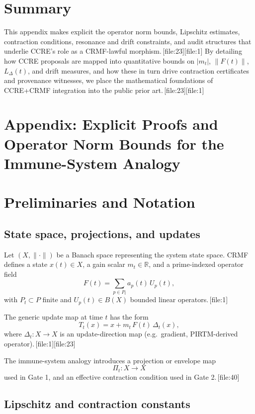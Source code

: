 \documentclass[11pt]{article}
\begin{document}
\section{Summary}

This appendix makes explicit the operator norm bounds, Lipschitz estimates, contraction conditions, resonance and drift constraints, and audit structures that underlie CCRE's role as a CRMF-lawful morphism.\,[file:23][file:1]
By detailing how CCRE proposals are mapped into quantitative bounds on $|m_t|$, $\|F(t)\|$, $L_\Delta(t)$, and drift measures, and how these in turn drive contraction certificates and provenance witnesses, we place the mathematical foundations of CCRE+CRMF integration into the public prior art.\,[file:23][file:1]

\appendix
\section*{Appendix: Explicit Proofs and Operator Norm Bounds for the Immune-System Analogy}

\section{Preliminaries and Notation}

\subsection{State space, projections, and updates}

Let \((X,\|\cdot\|)\) be a Banach space representing the system state space.
CRMF defines a state \(x(t)\in X\), a gain scalar \(m_t\in\mathbb{R}\), and a prime-indexed operator field
\[
F(t) = \sum_{p\in P_t} a_p(t)\,U_p(t),
\]
with \(P_t\subset P\) finite and \(U_p(t)\in B(X)\) bounded linear operators.\,[file:1]

The generic update map at time \(t\) has the form
\[
T_t(x) = x + m_t\,F(t)\,\Delta_t(x),
\]
where \(\Delta_t:X\to X\) is an update-direction map (e.g.\ gradient, PIRTM-derived operator).\,[file:1][file:23]

The immune-system analogy introduces a projection or envelope map
\[
\Pi_t : X \to X
\]
used in Gate 1, and an effective contraction condition used in Gate 2.\,[file:40]

\subsection{Lipschitz and contraction constants}
\end{document}
